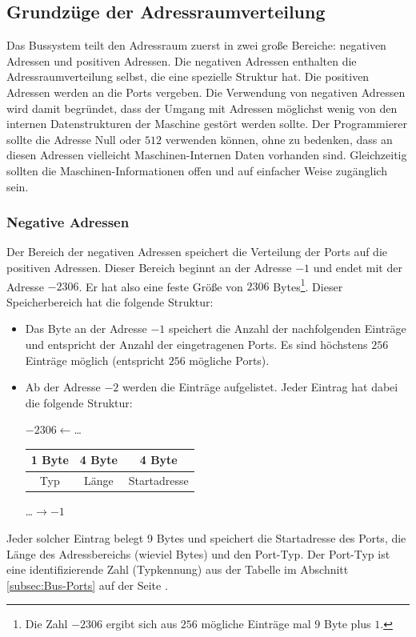 \subsection[Adressraumverteilung]{Grundzüge der Adressraumverteilung}
\label{subsec:Adressraumverteilung}

Das Bussystem teilt den Adressraum zuerst in zwei große Bereiche: negativen
Adressen und positiven Adressen.
Die negativen Adressen enthalten die Adressraumverteilung selbst, die eine
spezielle Struktur hat. Die positiven Adressen werden an die Ports vergeben.
Die Verwendung von negativen Adressen wird damit begründet, dass der Umgang mit
Adressen möglichst wenig von den internen Datenstrukturen der Maschine gestört
werden sollte. Der Programmierer sollte die Adresse Null oder $512$ verwenden
können, ohne zu bedenken, dass an diesen Adressen vielleicht Maschinen-Internen
Daten vorhanden sind.
Gleichzeitig sollten die Maschinen-Informationen offen und auf einfacher Weise
zugänglich sein.


\subsubsection{Negative Adressen}
Der Bereich der negativen Adressen speichert die Verteilung der Ports auf die
positiven Adressen. Dieser Bereich beginnt an der Adresse $-1$ und endet mit
der Adresse $-2306$. Er hat also eine feste Größe von $2306$
Bytes\footnote{Die Zahl $-2306$ ergibt sich aus $256$ mögliche
Einträge mal $9$ Byte plus $1$.}.
Dieser Speicherbereich hat die folgende Struktur:
\begin{itemize}
  \item
Das Byte an der Adresse $-1$ speichert die Anzahl der nachfolgenden Einträge und
entspricht der Anzahl der eingetragenen Ports.
Es sind höchstens $256$ Einträge möglich (entspricht $256$ mögliche Ports).

  \item
Ab der Adresse $-2$ werden die Einträge aufgelistet. Jeder Eintrag hat
dabei die folgende Struktur:
\begin{center}
  $-2306 \leftarrow$\ldots \quad 
  \begin{tabular}{|c|c|c|}
     1 Byte  & 4 Byte & 4 Byte        \\\hline
       Typ   & Länge  & Startadresse 
  \end{tabular}
  \quad \ldots$\rightarrow -1$ 
\end{center}

\end{itemize}
Jeder solcher Eintrag belegt 9 Bytes und speichert die Startadresse des Ports,
die Länge des Adressbereichs (wieviel Bytes) und den
Port-Typ.
Der Port-Typ ist eine identifizierende Zahl (Typkennung) aus der Tabelle im
Abschnitt \ref{subsec:Bus-Ports} auf der Seite \pageref{subsec:Bus-Ports}.

